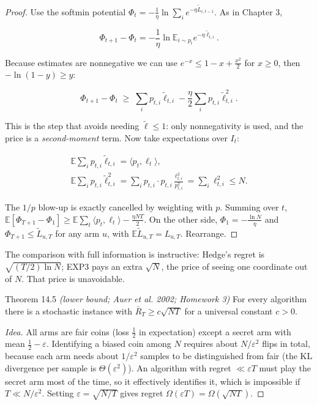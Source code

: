 \documentclass[11pt,a4paper,openany]{book}
\newcommand{\E}{\mathbb{E}}
\newcommand{\eps}{\varepsilon}
\newcommand{\ip}[2]{\langle #1,#2\rangle}
\begin{document}
\begin{proof}
Use the softmin potential $\Phi_t=-\frac1\eta\ln\sum_ie^{-\eta\tilde L_{i,t-1}}$. As in Chapter 3,

\[\Phi_{t+1}-\Phi_t=-\frac1\eta\ln\E_{i\sim p_t}e^{-\eta\tilde\ell_{t,i}}.\]

Because estimates are nonnegative we can use $e^{-x}\le1-x+\frac{x^2}2$ for $x\ge0$, then $-\ln(1-y)\ge y$:

\[\Phi_{t+1}-\Phi_t\;\ge\;\sum_ip_{t,i}\tilde\ell_{t,i}-\frac\eta2\sum_ip_{t,i}\tilde\ell_{t,i}^2.\]

This is the step that avoids needing $\tilde\ell\le1$: only nonnegativity is used, and the price is a \emph{second-moment} term. Now take expectations over $I_t$:

\[\begin{gathered}\E\sum_ip_{t,i}\tilde\ell_{t,i}=\ip{p_t}{\ell_t},\\
\E\sum_ip_{t,i}\tilde\ell_{t,i}^2=\sum_ip_{t,i}\cdot p_{t,i}\frac{\ell_{t,i}^2}{p_{t,i}^2}=\sum_i\ell_{t,i}^2\le N.\end{gathered}\]

The $1/p$ blow-up is exactly cancelled by weighting with $p$. Summing over $t$, $\E[\Phi_{T+1}-\Phi_1]\ge\E\sum_t\ip{p_t}{\ell_t}-\frac{\eta NT}2$. On the other side, $\Phi_1=-\frac{\ln N}\eta$ and $\Phi_{T+1}\le\tilde L_{u,T}$ for any arm $u$, with $\E\tilde L_{u,T}=L_{u,T}$. Rearrange.
\end{proof}

The comparison with full information is instructive: Hedge's regret is $\sqrt{(T/2)\ln N}$; EXP3 pays an extra $\sqrt N$, the price of seeing one coordinate out of $N$. That price is unavoidable.

\begin{bthm}{Theorem 14.5 \emph{(lower bound; Auer et al. 2002; Homework 3)}}
For every algorithm there is a stochastic instance with $\bar R_T\ge c\sqrt{NT}$ for a universal constant $c>0$.
\end{bthm}

\begin{proof}[Idea]
All arms are fair coins (loss $\tfrac12$ in expectation) except a secret arm with mean $\tfrac12-\eps$. Identifying a biased coin among $N$ requires about $N/\eps^2$ flips in total, because each arm needs about $1/\eps^2$ samples to be distinguished from fair (the KL divergence per sample is $\Theta(\eps^2)$). An algorithm with regret $\ll\eps T$ must play the secret arm most of the time, so it effectively identifies it, which is impossible if $T\ll N/\eps^2$. Setting $\eps=\sqrt{N/T}$ gives regret $\Omega(\eps T)=\Omega(\sqrt{NT})$.
\end{proof}
\end{document}
